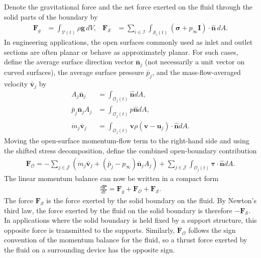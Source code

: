 Denote the gravitational force and the net force exerted on the fluid through the solid parts of the boundary by
\begin{align}
    \bm{F}_g
    &=
    \int_{\mathcal{V}(t)}\rho\bm{g}\,dV,
    &
    \bm{F}_\mathcal{S}
    &=
    \sum_{i\in\mathcal{I}}
    \int_{\mathcal{S}_i(t)}
    (\bm{\sigma}+p_\infty\bm{I})\cdot\bm{\hat{n}}\,dA.
\end{align}
In engineering applications, the open surfaces commonly used as inlet and outlet sections are often planar or behave as approximately planar. For such cases, define the average surface direction vector $\bar{\bm n}_j$ (not necessarily a unit vector on curved surfaces), the average surface pressure $\bar p_j$, and the mass-flow-averaged velocity $\bar{\bm v}_j$ by
\begin{align}
    A_j\bar{\bm{n}}_j&=\int_{\mathcal{O}_j(t)}\bm{\hat{n}}dA,\\
    \bar{p}_j\bar{\bm{n}}_jA_j&=\int_{\mathcal{O}_j(t)}p\bm{\hat{n}}dA,\\
    \dot{m}_j\bar{\bm{v}}_j&=\int_{\mathcal{O}_j(t)}\bm{v}\rho(\bm{v}-\bm{u}_j)\cdot\bm{\hat{n}}dA.
\end{align}
Moving the open-surface momentum-flow term to the right-hand side and using the shifted stress decomposition, define the combined open-boundary contribution
\begin{align}
    \bm{F}_\mathcal{O}=-\sum_{j\in\mathcal{J}}(\dot{m}_j\bar{\bm{v}}_j+(\bar{p}_j-p_\infty)\bar{\bm{n}}_jA_j)+\sum_{j\in\mathcal{J}}\int_{\mathcal{O}_j(t)}\bm{\tau}\cdot\bm{\hat{n}}dA.
\end{align}
The linear momentum balance can now be written in a compact form
\begin{align}\label{eq:linear-momentum-balance-control-volume}
    \frac{d\bm{P}}{dt}=\bm{F}_g+\bm{F}_\mathcal{O}+\bm{F}_\mathcal{S}.
\end{align}
The force $\bm{F}_\mathcal{S}$ is the force exerted by the solid boundary on the fluid. By Newton's third law, the force exerted by the fluid on the solid boundary is therefore $-\bm{F}_\mathcal{S}$. In applications where the solid boundary is held fixed by a support structure, this opposite force is transmitted to the supports. Similarly, $\bm{F}_\mathcal{O}$ follows the sign convention of the momentum balance for the fluid, so a thrust force exerted by the fluid on a surrounding device has the opposite sign.

